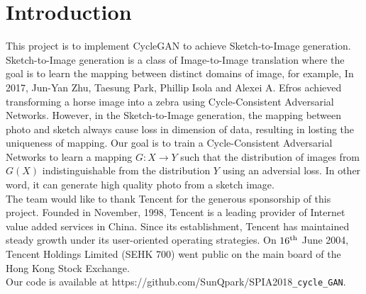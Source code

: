 \chapter{Introduction}\label{Ch:Introduction}
This project is to implement CycleGAN to achieve Sketch-to-Image generation. Sketch-to-Image generation is a class of Image-to-Image translation where the goal is to learn the mapping between distinct domains of image, for example, In 2017, Jun-Yan Zhu, Taesung Park, Phillip Isola and Alexei A. Efros achieved transforming a horse image into a zebra using Cycle-Consistent Adversarial Networks. However, in the Sketch-to-Image generation, the mapping between photo and sketch always cause loss in dimension of data, resulting in losting the uniqueness of mapping. Our goal is to train a Cycle-Consistent Adversarial Networks to learn a mapping \(G:X \rightarrow Y\) such that the distribution of images from \(G(X)\) indistinguishable from the distribution \(Y\) using an adversial loss. In other word, it can generate high quality photo from a sketch image.\\%

The team would like to thank Tencent for the generous sponsorship of this project. Founded in November, 1998, Tencent is a leading provider of Internet value added services in China. Since its establishment, Tencent has maintained steady growth under its user-oriented operating strategies. On \(16^{\textnormal{th}}\) June 2004, Tencent Holdings Limited (SEHK 700) went public on the main board of the Hong Kong Stock Exchange.\\





Our code is available at https://github.com/SunQpark/SPIA2018\texttt{\_cycle\_GAN}.




\endinput
